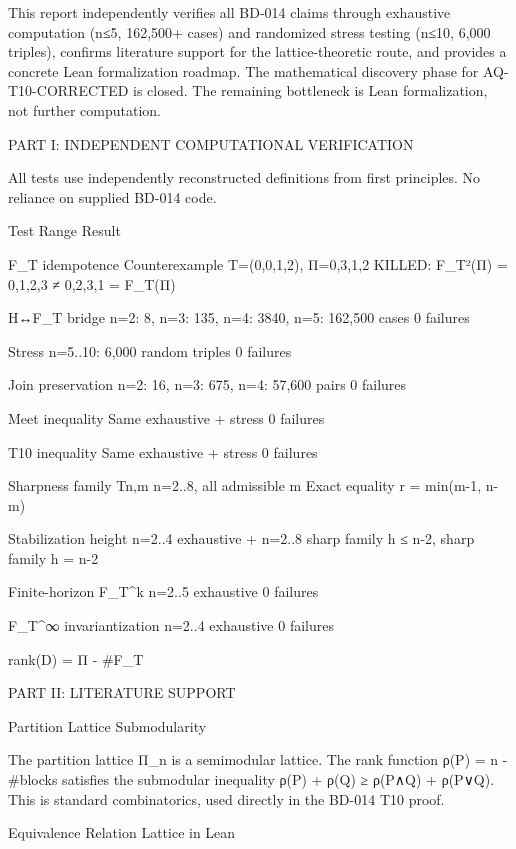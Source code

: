 This report independently verifies all BD-014 claims through exhaustive computation (n≤5, 162,500+ cases) and randomized stress testing (n≤10, 6,000 triples), confirms literature support for the lattice-theoretic route, and provides a concrete Lean formalization roadmap. The mathematical discovery phase for AQ-T10-CORRECTED is closed. The remaining bottleneck is Lean formalization, not further computation.



PART I: INDEPENDENT COMPUTATIONAL VERIFICATION


All tests use independently reconstructed definitions from first principles. No reliance on supplied BD-014 code.


Test	Range	Result	

F_T idempotence	Counterexample T=(0,0,1,2), Π={{0,3},{1},{2}}	KILLED: F_T²(Π) = {{0,1,2,3}} ≠ {{0,2,3},{1}} = F_T(Π)	

H↔F_T bridge	n=2: 8, n=3: 135, n=4: 3840, n=5: 162,500 cases	0 failures	

Stress n=5..10: 6,000 random triples	0 failures	

Join preservation	n=2: 16, n=3: 675, n=4: 57,600 pairs	0 failures	

Meet inequality	Same exhaustive + stress	0 failures	

T10 inequality	Same exhaustive + stress	0 failures	

Sharpness family T{n,m}	n=2..8, all admissible m	Exact equality r = min(m-1, n-m)	

Stabilization height	n=2..4 exhaustive + n=2..8 sharp family	h ≤ n-2, sharp family h = n-2	

Finite-horizon F_T^k	n=2..5 exhaustive	0 failures	

F_T^∞ invariantization	n=2..4 exhaustive	0 failures	

rank(D) =	Π	- #F_T



PART II: LITERATURE SUPPORT




Partition Lattice Submodularity




The partition lattice Π_n is a semimodular lattice. The rank function ρ(P) = n - #blocks satisfies the submodular inequality ρ(P) + ρ(Q) ≥ ρ(P∧Q) + ρ(P∨Q). This is standard combinatorics, used directly in the BD-014 T10 proof.




Equivalence Relation Lattice in Lean




